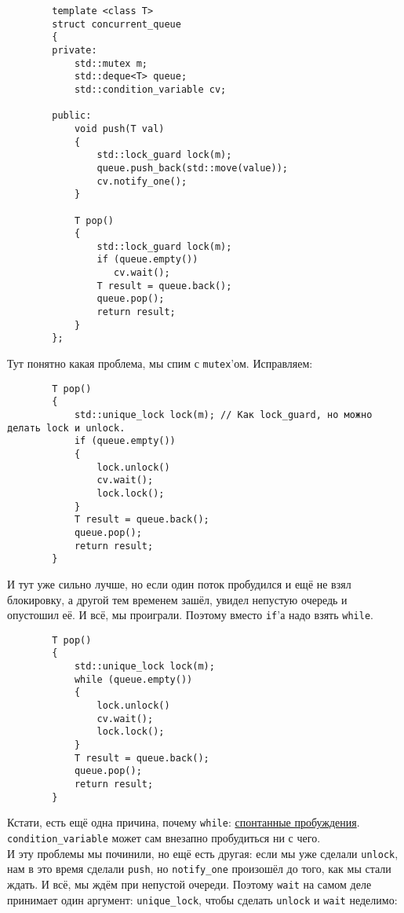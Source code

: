 \documentclass{article}
\begin{document}
    \begin{verbatim}
        template <class T>
        struct concurrent_queue
        {
        private:
            std::mutex m;
            std::deque<T> queue;
            std::condition_variable cv;
            
        public:
            void push(T val)
            {
                std::lock_guard lock(m);
                queue.push_back(std::move(value));
                cv.notify_one();
            }
            
            T pop()
            {
                std::lock_guard lock(m);
                if (queue.empty())
                   cv.wait();
                T result = queue.back();
                queue.pop();
                return result;
            }
        };
    \end{verbatim}
    Тут понятно какая проблема, мы спим с \texttt{mutex}'ом. Исправляем:
    \begin{verbatim}
        T pop()
        {
            std::unique_lock lock(m); // Как lock_guard, но можно делать lock и unlock.
            if (queue.empty())
            {
                lock.unlock()
                cv.wait();
                lock.lock();
            }
            T result = queue.back();
            queue.pop();
            return result;
        }
    \end{verbatim}
    И тут уже сильно лучше, но если один поток пробудился и ещё не взял блокировку, а другой тем временем зашёл, увидел непустую очередь и опустошил её. И всё, мы проиграли. Поэтому вместо \texttt{if}'а надо взять \texttt{while}.
    \begin{verbatim}
        T pop()
        {
            std::unique_lock lock(m);
            while (queue.empty())
            {
                lock.unlock()
                cv.wait();
                lock.lock();
            }
            T result = queue.back();
            queue.pop();
            return result;
        }
    \end{verbatim}
    Кстати, есть ещё одна причина, почему \texttt{while}: \href{https://en.wikipedia.org/wiki/Spurious_wakeup}{спонтанные пробуждения}. \texttt{condition_variable} может сам внезапно пробудиться ни с чего.\\
    И эту проблемы мы починили, но ещё есть другая: если мы уже сделали \texttt{unlock}, нам в это время сделали \texttt{push}, но \texttt{notify_one} произошёл до того, как мы стали ждать. И всё, мы ждём при непустой очереди. Поэтому \texttt{wait} на самом деле принимает один аргумент: \texttt{unique_lock}, чтобы сделать \texttt{unlock} и \texttt{wait} неделимо:
\end{document}
